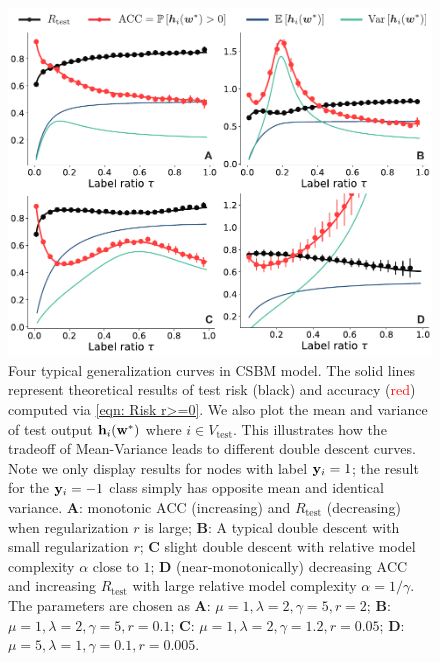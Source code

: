 \documentclass[9pt,twocolumn]{pnas-new}
\begin{document}
\begin{figure}[t]
    \includegraphics[width=\linewidth]{figs_acc.pdf}
    \caption{Four typical generalization curves in CSBM model. The solid lines represent theoretical results of test risk (black) and accuracy ({\textcolor{red}{red}}) computed via \eqref{eqn: Risk r>=0}.  We also plot the {\textcolor{myblue}{mean} and \textcolor{mygreen}{variance}} of test output $\mathbf{h}_i(\mathbf{w}^*)$ where $i\in V_{\text{test}}$. This illustrates how the tradeoff of Mean-Variance leads to different double descent curves. Note we only display results for nodes with label $\mathbf{y}_i=1$; the result for the $\mathbf{y}_i=-1$ class simply has opposite mean and identical variance.
     \textbf{\textsc{A}}: monotonic $\mathrm{ACC}$ (increasing) and $R_{\text{test}}$ (decreasing) when  regularization $r$ is large; \textbf{\textsf{B}}: A typical double descent with small regularization $r$; 
     \textbf{\textsf{C}} slight double descent with relative model complexity $\alpha$ close to $1$;
     \textbf{\textsf{D}} (near-monotonically) decreasing $\mathrm{ACC}$ and increasing $R_{\text{test}}$ with large relative model complexity $\alpha=1/\gamma$. The parameters are chosen as \textbf{\textsf{A}}: $\mu=1,\lambda=2,\gamma=5,r=2$; \textbf{\textsf{B}}: $\mu=1,\lambda=2,\gamma=5,r=0.1$;
     \textbf{\textsf{C}}: $\mu=1,\lambda=2,\gamma=1.2,r=0.05$; 
     \textbf{\textsf{D}}: $\mu=5,\lambda=1,\gamma=0.1,r=0.005$.
}
\end{figure}
\end{document}
